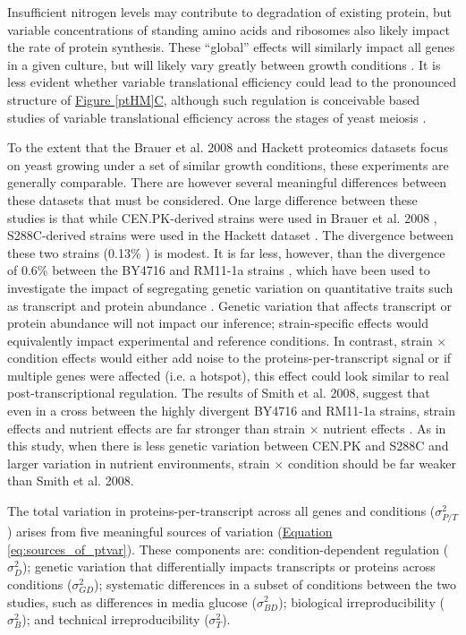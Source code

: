 Insufficient nitrogen levels may contribute to degradation of existing protein, but variable concentrations of standing amino acids and ribosomes also likely impact the rate of protein synthesis. These ``global'' effects will similarly impact all genes in a given culture, but will likely vary greatly between growth conditions \cite{Klumpp:2009ic}. It is less evident whether variable translational efficiency could lead to the pronounced structure of \hyperref[ptHM]{Figure \ref{ptHM}C}, although such regulation is conceivable based studies of variable translational efficiency across the stages of yeast meiosis \cite{Brar:2012ig}. 

To the extent that the Brauer et al. 2008 and Hackett proteomics datasets focus on yeast growing under a set of similar growth conditions, these experiments are generally comparable. There are however several meaningful differences between these datasets that must be considered. One large difference between these studies is that while CEN.PK-derived strains were used in Brauer et al. 2008 \cite{vanDijkenJP:2000er}, S288C-derived strains were used in the Hackett dataset \cite{Winston:1995io}. The divergence between these two strains (0.13\% \cite{Schacherer:2007ck}) is modest. It is far less, however, than the divergence of 0.6\% between the BY4716 and RM11-1a strains \cite{Foss:2007ej}, which have been used to investigate the impact of segregating genetic variation on quantitative traits such as transcript and protein abundance \cite{Brem:2005gh, Foss:2007ej}. Genetic variation that affects transcript or protein abundance will not impact our inference; strain-specific effects would equivalently impact experimental and reference conditions. In contrast, strain $\times$ condition effects would either add noise to the proteins-per-transcript signal or if multiple genes were affected (i.e. a hotspot), this effect could look similar to real post-transcriptional regulation. The results of Smith et al. 2008, suggest that even in a cross between the highly divergent BY4716 and RM11-1a strains, strain effects and nutrient effects are far stronger than strain $\times$ nutrient effects \cite{Smith:2008vy}. As in this study, when there is less genetic variation between CEN.PK and S288C and larger variation in nutrient environments, strain $\times$ condition should be far weaker than Smith et al. 2008.

The total variation in proteins-per-transcript across all genes and conditions ($\sigma^{2}_{P/T}$) arises from five meaningful sources of variation (\hyperref[eq:sources_of_ptvar]{Equation \ref{eq:sources_of_ptvar}}). These components are: condition-dependent regulation ($\sigma^{2}_{D}$); genetic variation that differentially impacts transcripts or proteins across conditions ($\sigma^{2}_{GD}$); systematic differences in a subset of conditions between the two studies, such as differences in media glucose ($\sigma^{2}_{BD}$); biological irreproducibility ($\sigma^{2}_{B}$); and technical irreproducibility ($\sigma^{2}_{T}$).

